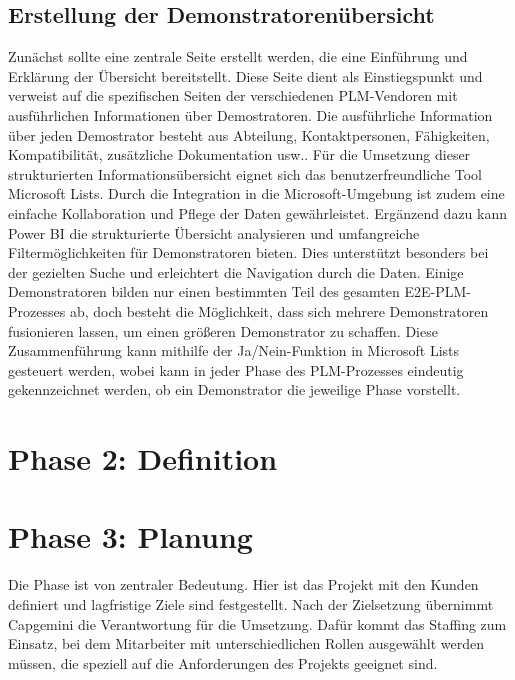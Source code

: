 \documentclass[a4paper, 12pt]{scrartcl}
\begin{document}
	\subsection{Erstellung der Demonstratorenübersicht}
Zunächst sollte eine zentrale Seite erstellt werden, die eine Einführung und Erklärung der Übersicht bereitstellt. Diese Seite dient als Einstiegspunkt und verweist auf die spezifischen Seiten der verschiedenen PLM-Vendoren mit ausführlichen Informationen über Demostratoren. Die ausführliche Information über jeden Demostrator besteht aus Abteilung, Kontaktpersonen, Fähigkeiten, Kompatibilität, zusätzliche Dokumentation usw.. Für die Umsetzung dieser strukturierten Informationsübersicht eignet sich das benutzerfreundliche Tool Microsoft Lists.\cite{List} Durch die Integration in die Microsoft-Umgebung ist zudem eine einfache Kollaboration und Pflege der Daten gewährleistet.\newline
Ergänzend dazu kann Power BI \cite{Power_bi} die strukturierte Übersicht analysieren und umfangreiche Filtermöglichkeiten für Demonstratoren bieten. Dies unterstützt besonders bei der gezielten Suche und erleichtert die Navigation durch die Daten.
Einige Demonstratoren bilden nur einen bestimmten Teil des gesamten E2E-PLM-Prozesses ab, doch besteht die Möglichkeit, dass sich mehrere Demonstratoren fusionieren lassen, um einen größeren Demonstrator zu schaffen. Diese Zusammenführung kann mithilfe der Ja/Nein-Funktion in Microsoft Lists gesteuert werden, wobei kann in jeder Phase des PLM-Prozesses eindeutig gekennzeichnet werden, ob ein Demonstrator die jeweilige Phase vorstellt.
	\section{Phase 2: Definition}
	\section{Phase 3: Planung}
Die Phase ist von zentraler Bedeutung. Hier ist das Projekt mit den Kunden definiert und lagfristige Ziele sind festgestellt. Nach der Zielsetzung übernimmt Capgemini die Verantwortung für die Umsetzung. Dafür kommt das Staffing zum Einsatz, bei dem Mitarbeiter mit unterschiedlichen Rollen ausgewählt werden müssen, die speziell auf die Anforderungen des Projekts geeignet sind.
\end{document}

